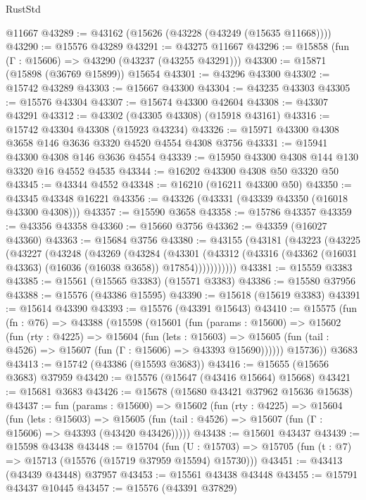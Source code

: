 \begin{lexlean}{RustStd}
\begin{coremodule}
    @11667
@43289 := @43162 (@15626 (@43228 (@43249 (@15635 @11668))))
@43290 := @15576 @43289
@43291 := @43275 @11667
@43296 := @15858 (fun (Γ : @15606) => @43290 (@43237 (@43255 @43291)))
@43300 := @15871 (@15898 (@36769 @15899)) @15654
@43301 := @43296 @43300
@43302 := @15742 @43289
@43303 := @15667 @43300
@43304 := @43235 @43303
@43305 := @15576 @43304
@43307 := @15674 @43300 @42604
@43308 := @43307 @43291
@43312 := @43302 (@43305 @43308) (@15918 @43161)
@43316 := @15742 @43304 @43308 (@15923 @43234)
@43326 := @15971 @43300 @4308 @3658 @146 @3636 @3320 @4520 @4554 @4308 @3756
@43331 := @15941 @43300 @4308 @146 @3636 @4554
@43339 := @15950 @43300 @4308 @144 @130 @3320 @16 @4552 @4535
@43344 := @16202 @43300 @4308 @50 @3320 @50
@43345 := @43344 @4552
@43348 := @16210 (@16211 @43300 @50)
@43350 := @43345 @43348 @16221
@43356 := @43326 (@43331 (@43339 @43350 (@16018 @43300 @4308)))
@43357 := @15590 @3658
@43358 := @15786 @43357
@43359 := @43356 @43358
@43360 := @15660 @3756
@43362 := @43359 (@16027 @43360)
@43363 := @15684 @3756
@43380 := @43155
    (@43181
      (@43223
        (@43225
          (@43227
            (@43248
              (@43269
                (@43284
                  (@43301
                    (@43312
                      (@43316 (@43362 (@16031 @43363) (@16036 (@16038 @3658)) @17854)))))))))))
@43381 := @15559 @3383
@43385 := @15561 (@15565 @3383) (@15571 @3383)
@43386 := @15580 @37956
@43388 := @15576 (@43386 @15595)
@43390 := @15618 (@15619 @3383)
@43391 := @15614 @43390
@43393 := @15576 (@43391 @15643)
@43410 := @15575
    (fun (fn : @76) =>
    @43388
      (@15598
        (@15601
          (fun (params : @15600) =>
          @15602
            (fun (rty : @4225) =>
            @15604
              (fun (lets : @15603) =>
              @15605 (fun (tail : @4526) => @15607 (fun (Γ : @15606) => @43393 @15690))))))
        @15736))
    @3683
@43413 := @15742 (@43386 (@15593 @3683))
@43416 := @15655 (@15656 @3683) @37959
@43420 := @15576 (@15647 (@43416 @15664) @15668)
@43421 := @15681 @3683
@43426 := @15678 (@15680 @43421 @37962 @15636 @15638)
@43437 := fun (params : @15600) =>
  @15602
    (fun (rty : @4225) =>
    @15604
      (fun (lets : @15603) =>
      @15605 (fun (tail : @4526) => @15607 (fun (Γ : @15606) => @43393 (@43420 @43426)))))
@43438 := @15601 @43437
@43439 := @15598 @43438
@43448 := @15704
    (fun (U : @15703) => @15705 (fun (t : @7) => @15713 (@15576 (@15719 @37959 @15594) @15730)))
@43451 := @43413 (@43439 @43448) @37957
@43453 := @15561 @43438 @43448
@43455 := @15791 @43437 @10445
@43457 := @15576 (@43391 @37829)

\end{coremodule}
\end{lexlean}
